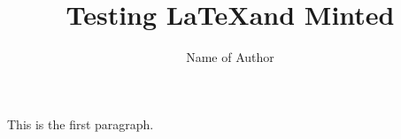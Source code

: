 \documentclass{article}
\begin{document}
\title{Testing \LaTeX and Minted}
\author{Name of Author}
\date{}

\maketitle

This is the first paragraph.

\inputminted[lastline=7]{rust}{lib.rs}
\end{document}
